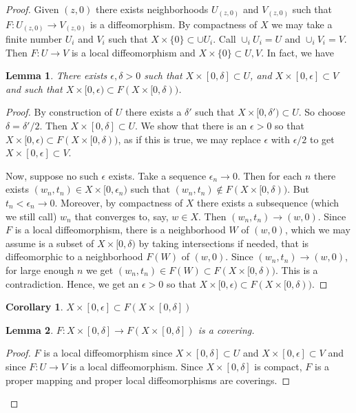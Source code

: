 \documentclass{amsart}
\newtheorem*{lem*}{Lemma}
\newtheorem*{cor*}{Corollary}
\begin{document}
\begin{proof}
Given $(z,0)$ there exists neighborhoods $U_{(z,0)}$ and $V_{(z,0)}$ such that $F: U_{(z,0)} \to V_{(z,0)}$ is a diffeomorphism. 
By compactness of $X$ we may take a finite number $U_i$ and $V_i$ such that $X \times \{0\} \subset \cup U_i$. Call $\cup_i U_i = U$ and $\cup_i V_i = V$. Then $F: U \to V$ is a local diffeomorphism and $X \times \{0\} \subset U, V$. 
In fact, we have 
\begin{lem*}
There exists $\epsilon,\delta > 0$ such that $X \times [0,\delta] \subset U$, and $X \times [0,\epsilon] \subset V$ and such that $X \times [0,\epsilon) \subset F(X \times [0,\delta))$.
\end{lem*}
\begin{proof}
By construction of $U$ there exists a $\delta'$ such that $X \times [0,\delta') \subset U$. So choose $\delta = \delta'/2$. Then $X \times [0, \delta] \subset U$.
We show that there is an $\epsilon > 0$ so that $X \times [0,\epsilon) \subset F(X \times [0,\delta))$, as if this is true, we may replace $\epsilon$ with $\epsilon/2$ to get $X \times [0,\epsilon] \subset V$.

Now, suppose no such $\epsilon$ exists. 
Take a sequence $\epsilon_n \to 0$. 
Then for each $n$ there exists $(w_n, t_n) \in X \times [0, \epsilon_n)$ such that $(w_n,t_n) \notin F(X \times [0,\delta))$. 
But $t_n < \epsilon_n \to 0$. 
Moreover, by compactness of $X$ there exists a subsequence (which we still call) $w_n$ that converges to, say, $w \in X$. 
Then $(w_n,t_n) \to (w,0)$. 
Since $F$ is a local diffeomorphism, there is a neighborhood $W$ of $(w,0)$, which we may assume is a subset of $X \times [0,\delta)$ by taking intersections if needed, that is diffeomorphic to a neighborhood $F(W)$ of $(w,0)$. 
Since $(w_n, t_n) \to (w,0)$, for large enough $n$ we get $(w_n,t_n) \in F(W) \subset F(X \times [0,\delta))$. 
This is a contradiction. 
Hence, we get an $\epsilon >0$ so that $X \times [0,\epsilon) \subset F(X \times [0,\delta))$.
\end{proof}

\begin{cor*}
$X \times [0,\epsilon] \subset F(X \times [0,\delta])$
\end{cor*}

\begin{lem*}
$F: X \times [0,\delta] \to F(X \times [0,\delta])$ is a covering. 
\end{lem*}

\begin{proof}
$F$ is a local diffeomorphism since $X \times [0,\delta] \subset U$ and $X \times [0,\epsilon] \subset V$ and since $F: U \to V$ is a local diffeomorphism. 
Since $X \times [0,\delta]$ is compact, $F$ is a proper mapping and proper local diffeomorphisms are coverings. 
\end{proof}


\end{proof}
\end{document}

